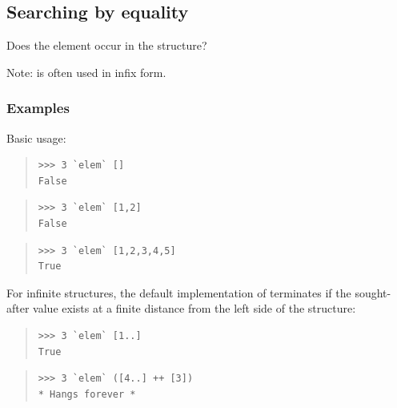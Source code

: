 \subsection{Searching by equality}
\begin{haddockdesc}
\item[\begin{tabular}{@{}l}
elem :: (Foldable t, Eq a) => a -> t a -> Bool
\end{tabular}]
{\haddockbegindoc
Does the element occur in the structure?\par
Note:  is often used in infix form.\par
\subsubsection*{\textbf{Examples}}
Basic usage:\par
\begin{quote}
{\haddockverb\begin{verbatim}
>>> 3 `elem` []
False

\end{verbatim}}
\end{quote}
\begin{quote}
{\haddockverb\begin{verbatim}
>>> 3 `elem` [1,2]
False

\end{verbatim}}
\end{quote}
\begin{quote}
{\haddockverb\begin{verbatim}
>>> 3 `elem` [1,2,3,4,5]
True

\end{verbatim}}
\end{quote}
For infinite structures, the default implementation of 
 terminates if the sought-after value exists at a finite distance
 from the left side of the structure:\par
\begin{quote}
{\haddockverb\begin{verbatim}
>>> 3 `elem` [1..]
True

\end{verbatim}}
\end{quote}
\begin{quote}
{\haddockverb\begin{verbatim}
>>> 3 `elem` ([4..] ++ [3])
* Hangs forever *

\end{verbatim}}
\end{quote}}
\end{haddockdesc}
